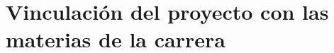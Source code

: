 
\chapter{Vinculación del proyecto con las materias de la carrera} %

\label{Chapter4} %
\label{Vinculación del proyecto con las materias de la carrera}


\newcommand{\keyword}[1]{\textbf{#1}}
\newcommand{\tabhead}[1]{\textbf{#1}}
\newcommand{\code}[1]{\texttt{#1}}
\newcommand{\file}[1]{\texttt{\bfseries#1}}
\newcommand{\option}[1]{\texttt{\itshape#1}}
\newcommand{\grados}{$^{\circ}$}

